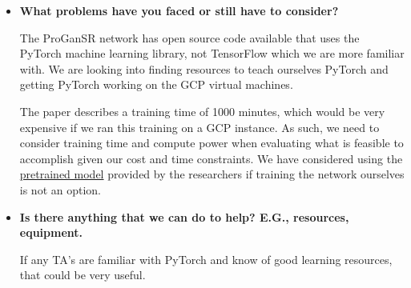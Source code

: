 \begin{itemize}
  \item \textbf{What problems have you faced or still have to consider?}
  
  The ProGanSR network has open source code available that uses the PyTorch machine learning library, not TensorFlow which we are more familiar with. We are looking into finding resources to teach ourselves PyTorch and getting PyTorch working on the GCP virtual machines. 
  
  The paper describes a training time of 1000 minutes, which would be very expensive if we ran this training on a GCP instance. As such, we need to consider training time and compute power when evaluating what is feasible to accomplish given our cost and time constraints. We have considered using the \href{https://github.com/fperazzi/proSR/issues/1}{pretrained model} provided by the researchers if training the network ourselves is not an option. 
  
  \item \textbf{Is there anything that we can do to help? E.G., resources, equipment.}
  
  If any TA's are familiar with PyTorch and know of good learning resources, that could be very useful.
  
 
\end{itemize}


